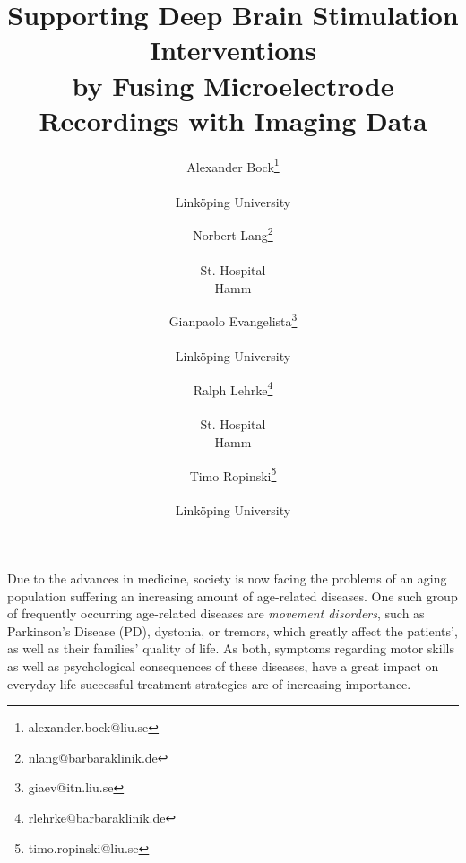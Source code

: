\documentclass{vgtc}                          %
\title{Supporting Deep Brain Stimulation Interventions \\ by Fusing Microelectrode Recordings with Imaging Data}
\author{Alexander Bock\thanks{alexander.bock@liu.se} \\ %
	\parbox{1in}{\scriptsize \centering Link\"oping University}
\and Norbert Lang\thanks{nlang@barbaraklinik.de} \\ %
	\parbox{1in}{\scriptsize \centering St. Hospital \\ Hamm}
\and Gianpaolo Evangelista\thanks{giaev@itn.liu.se} \\ %
	\parbox{1in}{\scriptsize \centering Link\"oping University}
\and Ralph Lehrke\thanks{rlehrke@barbaraklinik.de} \\ %
	\parbox{1in}{\scriptsize \centering St. Hospital \\ Hamm}
\and Timo Ropinski\thanks{timo.ropinski@liu.se} \\ %
	\parbox{1in}{\scriptsize \centering Link\"oping University}
}
\begin{document}
\label{sec:introduction}

\maketitle

Due to the advances in medicine, society is now facing the problems of an aging population suffering an increasing amount of age-related diseases. One such group of frequently occurring age-related diseases are \emph{movement disorders}, such as Parkinson's Disease (PD), dystonia, or tremors, which greatly affect the patients', as well as their families' quality of life. As both, symptoms regarding motor skills as well as psychological consequences of these diseases, have a great impact on everyday life successful treatment strategies are of increasing importance.
\end{document}
